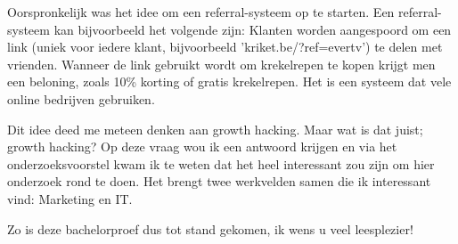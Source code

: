 Oorspronkelijk was het idee om een referral-systeem op te starten. Een referral-systeem kan bijvoorbeeld het volgende zijn: Klanten worden aangespoord om een link (uniek voor iedere klant, bijvoorbeeld 'kriket.be/?ref=evertv') te delen met vrienden. Wanneer de link gebruikt wordt om krekelrepen te kopen krijgt men een beloning, zoals 10\% korting of gratis krekelrepen. Het is een systeem dat vele online bedrijven gebruiken. 

Dit idee deed me meteen denken aan growth hacking. Maar wat is dat juist; growth hacking? Op deze vraag wou ik een antwoord krijgen en via het onderzoeksvoorstel kwam ik te weten dat het heel interessant zou zijn om hier onderzoek rond te doen. Het brengt twee werkvelden samen die ik interessant vind: Marketing en IT.

Zo is deze bachelorproef dus tot stand gekomen, ik wens u veel leesplezier!
